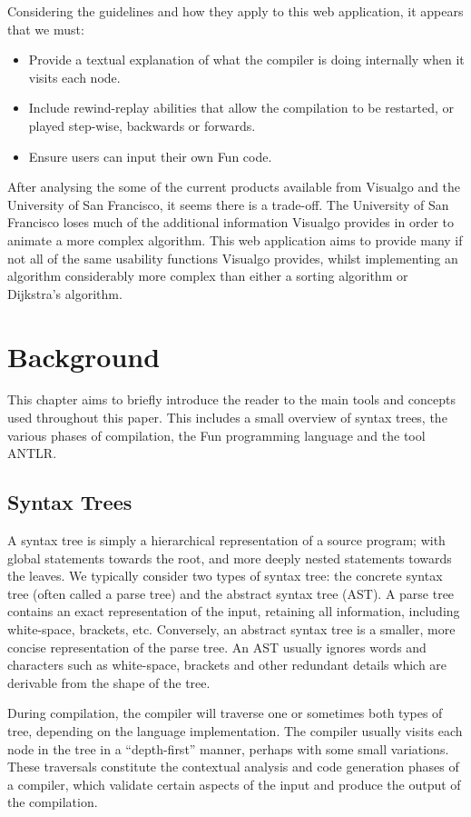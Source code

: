 \documentclass{l4proj}
\begin{document}
Considering the guidelines and how they apply to this web application, it appears that we must:
\begin{itemize}
\item Provide a textual explanation of what the compiler is doing internally when it visits each node.
\item Include rewind-replay abilities that allow the compilation to be restarted, or played step-wise, backwards or forwards.
\item Ensure users can input their own Fun code.
\end{itemize}

After analysing the some of the current products available from Visualgo and the University of San Francisco, it seems there is a trade-off. The University of San Francisco loses much of the additional information Visualgo provides in order to animate a more complex algorithm. This web application aims to provide many if not all of the same usability functions Visualgo provides, whilst implementing an algorithm considerably more complex than either a sorting algorithm or Dijkstra's algorithm. 

\chapter{Background}
This chapter aims to briefly introduce the reader to the main tools and concepts used throughout this paper. This includes a small overview of syntax trees, the various phases of compilation, the Fun programming language and the tool ANTLR.

\section{Syntax Trees}
A syntax tree is simply a hierarchical representation of a source program; with global statements towards the root, and more deeply nested statements towards the leaves. We typically consider two types of syntax tree: the concrete syntax tree (often called a parse tree) and the abstract syntax tree (AST). A parse tree contains an exact representation of the input, retaining all information, including white-space, brackets, etc. Conversely, an abstract syntax tree is a smaller, more concise representation of the parse tree. An AST usually ignores words and characters such as white-space, brackets and other redundant details which are derivable from the shape of the tree. 

During compilation, the compiler will traverse one or sometimes both types of tree, depending on the language implementation. The compiler usually visits each node in the tree in a ``depth-first'' manner, perhaps with some small variations. These traversals constitute the contextual analysis and code generation phases of a compiler, which validate certain aspects of the input and produce the output of the compilation. 
\end{document}
